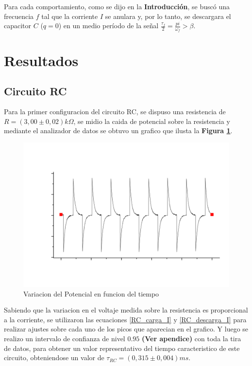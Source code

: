 \documentclass[11pt,a4paper]{article}
\begin{document}
Para cada comportamiento, como se dijo en la \textbf{Introducción}, se buscó una frecuencia $f$ tal que la corriente $I$ se anulara y, por lo tanto, se descargara el capacitor $C$ ($q=0$) en un medio período de la señal $\frac{\tau_f}{2} = \frac{pi}{\omega_f} > \beta$.



\section{Resultados}
\label{sec:discusion}

\subsection{Circuito RC}
Para la primer configuracion del circuito RC, se dispuso una resistencia de $R = (3,00\pm0,02)k\Omega$, se midio la caida de potencial sobre la resistencia y mediante el analizador de datos se obtuvo un grafico que ilusta la \textbf{Figura \ref{fig:RC-CR}}.

\begin{figure}[H]
\centering
\includegraphics[scale=0.45]{RC-Caida_en_Resistencia}
  \caption{Variacion del Potencial en funcion del tiempo}
  \label{fig:RC-CR}
\end{figure}

Sabiendo que la variacion en el voltaje medida sobre la resistencia es proporcional a la corriente, se utilizaron las ecuaciones \eqref{RC_carga_I} y  \eqref{RC_descarga_I} para realizar ajustes sobre cada uno de los picos que aparecian en el grafico. Y luego se realizo un intervalo de confianza de nivel $0.95$ \textbf{(Ver apendice)} con toda la tira de datos, para obtener un valor representativo del tiempo caracteristico de este circuito, obteniendose un valor de  $\tau_{RC}=(0,315 \pm 0,004) ms$.
\end{document}
